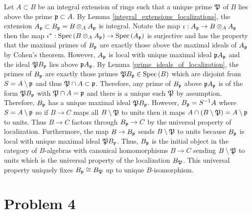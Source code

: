 \documentclass[12pt]{extarticle}
\begin{document}
Let $A \subset B$ be an integral extension of rings such that a unique prime $\P$ of $B$ lies above the prime $\p \subset A$. By Lemma \ref{integral_extensions_localizations}, the extension $A_{\p} \subset B_{\p} = B \otimes_A A_{\p}$ is integral. Notate the map $\iota : A_{\p} \to B \otimes_A A_{\p}$ then the map $\iota^* : \Spec{B \otimes_A A_{\p}} \to \Spec{A_{\p}}$ is surjective and has the property that the maximal primes of $B_{\p}$ are exactly those above the maximal ideals of $A_{\p}$ by Cohen's theorem. However, $A_{\p}$ is local with unique maximal ideal $\p A_{\p}$ and the ideal $\P B_{\p}$ lies above $\p A_{\p}$. By Lemma \ref{prime_ideals_of_localization}, the primes of $B_{\p}$ are exactly those primes $\P B_{\p} \in \spec{B}$ which are disjoint from $S = A \setminus \p$ and thus $\P \cap A \subset \p$. Therefore, any prime of $B_{\p}$ above $\p A_{\p}$ is of the form $\P B_{\p}$ with $\P \cap A = \p$ and there is a unique such $\P$ by assumption. Therefore, $B_{\p}$ has a unique maximal ideal $\P B_{\p}$. However, $B_{\p} = S^{-1} A$ where $S = A \setminus \p$ so if $B \to C$ maps all $B \setminus \P$ to units then it maps $A \cap (B \setminus \P) = A \setminus \p$ to units. Thus $B \to C$ factors through $B_{\p} \to C$ by the universal property of localization. Furthermore, the map $B \to B_{\p}$ sends $B \setminus \P$ to units because $B_{\p}$ is local with unique maximal ideal $\P B_{\p}$. Thus, $B_\p$ is the initial object in the category of $B$-algebras with canonical homomorphisms $B \to C$ sending $B \setminus \P$ to units which is the universal property of the localization $B_{\P}$. This universal property uniquely fixes $B_{\p} \cong B_{\P}$ up to unique $B$-isomorphism.   

\section*{Problem 4}
\end{document}
